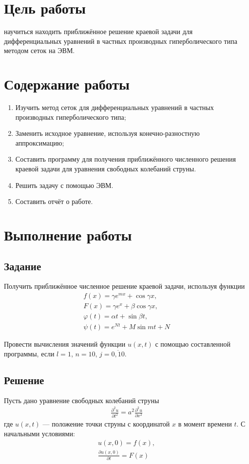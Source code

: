 \section{Цель работы}
научиться находить приближённое решение краевой задачи для дифференциальных уравнений в частных производных гиперболического типа методом сеток на ЭВМ.

\section{Содержание работы}
\begin{enumerate}
	\item Изучить метод сеток для дифференциальных уравнений в частных производных гиперболического типа;
	\item Заменить исходное уравнение, используя конечно-разностную аппроксимацию;
	\item Составить программу для получения приближённого численного решения краевой задачи для уравнения свободных колебаний струны.
	\item Решить задачу с помощью ЭВМ.
	\item Составить отчёт о работе.
\end{enumerate}

\section{Выполнение работы}
\subsection{Задание}
Получить приближённое численное решение краевой задачи, используя функции
\begin{align}
	f(x) = \gamma e^{m x} + \cos{\gamma x},   \\
	F(x) = \gamma e^x + \beta \cos{\gamma x}, \\
	\varphi(t) = \alpha t + \sin{\beta t},    \\
	\psi(t) = e^{N t} + M \sin{m t} + N
\end{align}

Провести вычисления значений функции \(u(x,t)\) с помощью составленной программы, если \(l = 1\), \(n = 10\), \(j = \overline{0, 10}\).

\subsection{Решение}
Пусть дано уравнение свободных колебаний струны
\begin{align} \label{eq:init-u-diff}
	\frac{\partial^2 u}{\partial t^2} = a^2 \frac{\partial^2 u}{\partial x^2}
\end{align}
где \(u(x,t)\) ---  положение точки струны с координатой \(x\) в момент времени \(t\).
С начальными условиями:
\begin{align}\label{eq:init-cond}
	u(x, 0) = f(x), \\
	\label{eq:init-cond-prt}
	\frac{\partial u(x,0)}{\partial t} = F(x)
\end{align}

